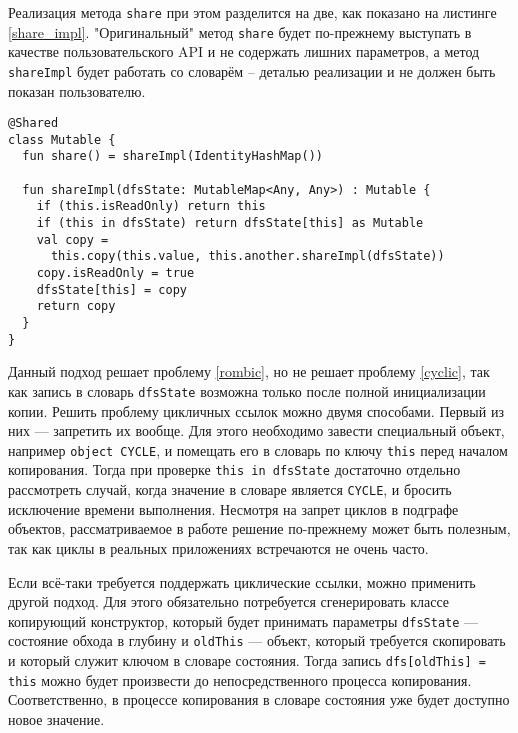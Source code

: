 \documentclass[specification,annotation,times]{itmo-student-thesis}
\begin{document}
Реализация метода \texttt{share} при этом разделится на две, как показано на листинге \ref{share_impl}.
"Оригинальный" метод \texttt{share} будет по-прежнему выступать в качестве пользовательского API и не содержать лишних параметров, а метод \texttt{shareImpl} будет работать со словарём -- деталью реализации и не должен быть показан пользователю.

\begin{lstlisting}[float=h!,caption={Усовершенствование share},label={share_impl}]
@Shared
class Mutable {
  fun share() = shareImpl(IdentityHashMap())
    
  fun shareImpl(dfsState: MutableMap<Any, Any>) : Mutable {
    if (this.isReadOnly) return this
	if (this in dfsState) return dfsState[this] as Mutable
	val copy = 
	  this.copy(this.value, this.another.shareImpl(dfsState))
	copy.isReadOnly = true
	dfsState[this] = copy
	return copy
  }
}
\end{lstlisting}

Данный подход решает проблему \ref{rombic}, но не решает проблему \ref{cyclic}, так как запись в словарь \texttt{dfsState} возможна только после полной инициализации копии.
Решить проблему цикличных ссылок можно двумя способами. Первый из них --- запретить их вообще. Для этого необходимо завести специальный объект, например \texttt{object CYCLE}, и помещать его в словарь по ключу \texttt{this} перед началом копирования.
Тогда при проверке \texttt{this in dfsState} достаточно отдельно рассмотреть случай, когда значение в словаре является \texttt{CYCLE}, и бросить исключение времени выполнения.
Несмотря на запрет циклов в подграфе объектов, рассматриваемое в работе решение по-прежнему может быть полезным, так как циклы в реальных приложениях встречаются не очень часто.

Если всё-таки требуется поддержать циклические ссылки, можно применить другой подход.
Для этого обязательно потребуется сгенерировать классе копирующий конструктор, который будет принимать параметры \texttt{dfsState} --- состояние обхода в глубину и \texttt{oldThis} --- объект, который требуется скопировать и который служит ключом в словаре состояния.
Тогда запись \texttt{dfs[oldThis] = this} можно будет произвести до непосредственного процесса копирования. Соответственно, в процессе копирования в словаре состояния уже будет доступно новое значение.
\end{document}
